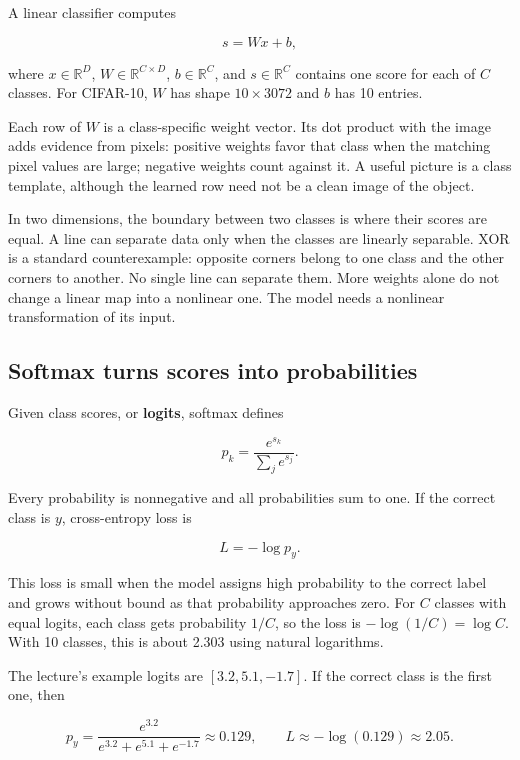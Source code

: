 A linear classifier computes

\[s=Wx+b,\]

where \(x\in\mathbb{R}^{D}\), \(W\in\mathbb{R}^{C\times D}\), \(b\in\mathbb{R}^{C}\), and \(s\in\mathbb{R}^{C}\) contains one score for each of \(C\) classes. For CIFAR-10, \(W\) has shape \(10\times3072\) and \(b\) has 10 entries.

Each row of \(W\) is a class-specific weight vector. Its dot product with the image adds evidence from pixels: positive weights favor that class when the matching pixel values are large; negative weights count against it. A useful picture is a class template, although the learned row need not be a clean image of the object.

In two dimensions, the boundary between two classes is where their scores are equal. A line can separate data only when the classes are linearly separable. XOR is a standard counterexample: opposite corners belong to one class and the other corners to another. No single line can separate them. More weights alone do not change a linear map into a nonlinear one. The model needs a nonlinear transformation of its input.

\subsection{Softmax turns scores into probabilities}\label{04-visual-computing-ii-ch031-softmax-turns-scores-into-probabilities}

\hypertarget{04-visual-computing-ii-ch031-softmax-turns-scores-into-probabilities}{}

Given class scores, or \textbf{logits}, softmax defines

\[p_k=\frac{e^{s_k}}{\sum_j e^{s_j}}.\]

Every probability is nonnegative and all probabilities sum to one. If the correct class is \(y\), cross-entropy loss is

\[L=-\log p_y.\]

This loss is small when the model assigns high probability to the correct label and grows without bound as that probability approaches zero. For \(C\) classes with equal logits, each class gets probability \(1/C\), so the loss is \(-\log(1/C)=\log C\). With 10 classes, this is about 2.303 using natural logarithms.

The lecture's example logits are \([3.2,5.1,-1.7]\). If the correct class is the first one, then

\[p_y=\frac{e^{3.2}}{e^{3.2}+e^{5.1}+e^{-1.7}}\approx0.129, \qquad L\approx-\log(0.129)\approx2.05.\]


